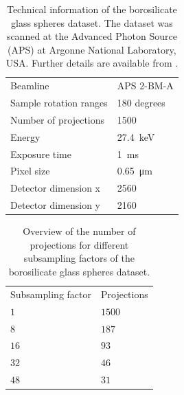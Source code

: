 \begin{table}[htbp]
    \centering
    \caption[Technical information of the borosilicate glass spheres dataset]{Technical information of the borosilicate glass spheres dataset. The dataset was scanned at the Advanced Photon Source (APS) at Argonne National Laboratory, USA. Further details are available from \cite{datasetglassspheres}. }
    \label{tab:tomo00058}
    \begin{tabular}{ll}
    \hline
    Beamline & APS 2-BM-A\\
    Sample rotation ranges & 180 degrees \\
    Number of projections & 1500 \\
    Energy & \SI{27.4}{\kilo \electronvolt}\\
    Exposure time & \SI{1}{\milli \second}\\
    Pixel size & \SI{0.65}{\micro \meter} \\
    Detector dimension x & 2560 \\
    Detector dimension y & 2160 \\
    \hline
    \end{tabular}
\end{table}

\begin{table}[htbp]
    \centering
    \caption[Projection subsampling overview for reconstructions of the borosilicate glass spheres dataset.]{Overview of the number of projections for different subsampling factors of the borosilicate glass spheres dataset. }
    \label{tab:projectionsubsampling}
    \begin{tabular}{ll}
    \hline
    Subsampling factor & Projections \\
    \hhline{==}
    $1$ & $1500$ \\
    $8$ & $187$ \\
    $16$ & $93$ \\
    $32$ & $46$ \\
    $48$ & $31$ \\
    \hline
    \end{tabular}
\end{table}

